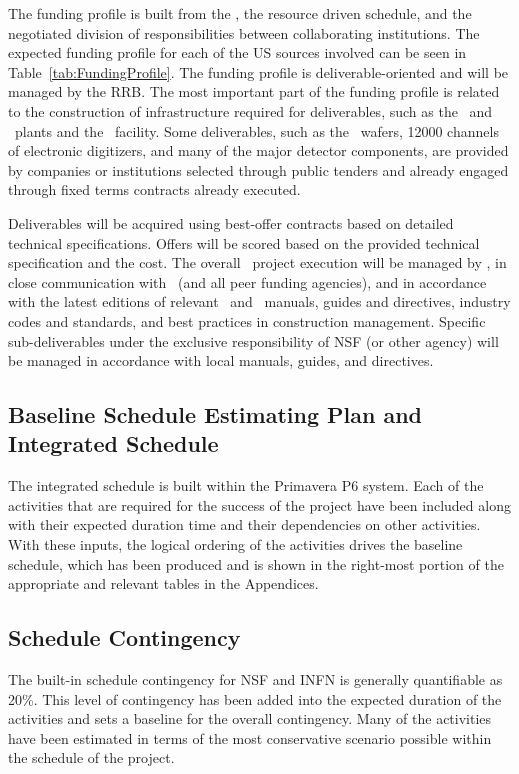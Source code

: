 The funding profile is built from the \WBS, the resource driven schedule, and the negotiated division of responsibilities between collaborating institutions.  The expected funding profile for each of the US sources involved can be seen in Table~\ref{tab:FundingProfile}. The funding profile is deliverable-oriented and will be managed by the RRB.  The most important part of the funding profile is related to the construction of infrastructure required for deliverables, such as the \Urania\ and \Aria\ plants and the \NOA\ facility. Some deliverables, such as the \SiPM\ wafers, \num[group-separator={,}]{12000} channels of electronic digitizers, and many of the major detector components, are provided by companies or institutions selected through public tenders and already engaged through fixed terms contracts already executed.

Deliverables will be acquired using best-offer contracts based on detailed technical specifications.  Offers will be scored based on the provided technical specification and the cost.  The overall \DSk\ project execution will be managed by \INFN, in close communication with \NSF\ (and all peer funding agencies), and in accordance with the latest editions of relevant \INFN\ and \NSF\ manuals, guides and directives, industry codes and standards, and best practices in construction management.  Specific sub-deliverables under the exclusive responsibility of NSF (or other agency) will be managed in accordance with local manuals, guides, and directives.


\subsection{Baseline Schedule Estimating Plan and Integrated Schedule}
The integrated schedule is built within the Primavera P6 system.  Each of the activities that are required for the success of the project have been included along with their expected duration time and their dependencies on other activities.  With these inputs, the logical ordering of the activities drives the baseline schedule, which has been produced and is shown in the right-most portion of the appropriate and relevant tables in the Appendices.  

\subsection{Schedule Contingency}
The built-in schedule contingency for NSF and INFN is generally quantifiable as 20\%. This level of contingency has been added into the expected duration of the activities and sets a baseline for the overall contingency.  Many of the activities have been estimated in terms of the most conservative scenario possible within the schedule of the project.

